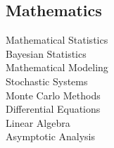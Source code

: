\documentclass[letterpaper]{AMcEnaneyResume} %
\begin{document}
\begin{minipage}[t]{0.33\textwidth}
        \sectionspace %

    \subsection{Mathematics}

        \textbullet{} Mathematical Statistics \\
        \textbullet{} Bayesian Statistics \\
        \textbullet{} Mathematical Modeling \\
        \textbullet{} Stochastic Systems \\
        \textbullet{} Monte Carlo Methods \\
        \textbullet{} Differential Equations \\
        \textbullet{} Linear Algebra \\
        \textbullet{} Asymptotic Analysis \\



\end{minipage} %
\hfill
%
%
\end{document}
